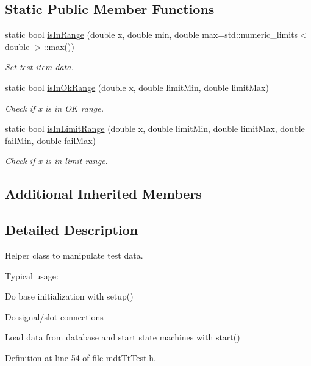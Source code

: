 \subsection*{Static Public Member Functions}
\begin{DoxyCompactItemize}
\item 
static bool \hyperlink{classmdt_tt_test_a5920961d0f32d37033a184ed76b2cf3d}{is\-In\-Range} (double x, double min, double max=std\-::numeric\-\_\-limits$<$ double $>$\-::max())
\begin{DoxyCompactList}\small\item\em Set test item data. \end{DoxyCompactList}\item 
static bool \hyperlink{classmdt_tt_test_a62a8e5118129566aa897bba3ff079a4e}{is\-In\-Ok\-Range} (double x, double limit\-Min, double limit\-Max)
\begin{DoxyCompactList}\small\item\em Check if x is in O\-K range. \end{DoxyCompactList}\item 
static bool \hyperlink{classmdt_tt_test_a0384aea1eb7edde259888e5fecae976c}{is\-In\-Limit\-Range} (double x, double limit\-Min, double limit\-Max, double fail\-Min, double fail\-Max)
\begin{DoxyCompactList}\small\item\em Check if x is in limit range. \end{DoxyCompactList}\end{DoxyCompactItemize}
\subsection*{Additional Inherited Members}


\subsection{Detailed Description}
Helper class to manipulate test data. 

Typical usage\-:
\begin{DoxyItemize}
\item Do base initialization with setup()
\item Do signal/slot connections
\item Load data from database and start state machines with start() 
\end{DoxyItemize}

Definition at line 54 of file mdt\-Tt\-Test.\-h.



